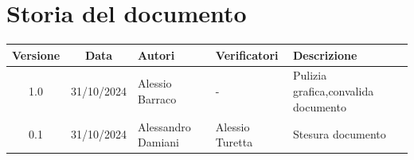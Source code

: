 \section{Storia del documento}
\begin{tabularx}{\textwidth}{ c c p{3.2cm} p{3.17cm} X }
    \rowcolor{gray!20}\rule{0pt}{0.5cm}\textbf{Versione} & \textbf{Data} & \textbf{Autori} & \textbf{Verificatori} & \textbf{Descrizione} \\[0.7ex]
    \hline
    \rule{0pt}{0.5cm}1.0 & 31/10/2024 & Alessio Barraco &  - & Pulizia grafica,\newline convalida documento\\[3.5ex]
    \hline
    \rule{0pt}{0.5cm}0.1 & 31/10/2024 & Alessandro Damiani & Alessio Turetta & Stesura documento\\[0.7ex] 
\end{tabularx}